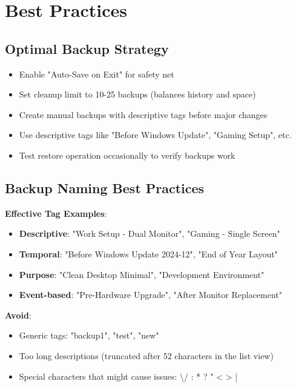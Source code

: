 \documentclass[a4paper,11pt]{article}
\begin{document}
\section{Best Practices}

\subsection{Optimal Backup Strategy}

\begin{successbox}
  \begin{itemize}
    \item Enable "Auto-Save on Exit" for safety net
    \item Set cleanup limit to 10-25 backups (balances history and space)
    \item Create manual backups with descriptive tags before major changes
    \item Use descriptive tags like "Before Windows Update", "Gaming
      Setup", etc.
    \item Test restore operation occasionally to verify backups work
  \end{itemize}
\end{successbox}

\subsection{Backup Naming Best Practices}

\textbf{Effective Tag Examples}:
\begin{itemize}
  \item \textbf{Descriptive}: "Work Setup - Dual Monitor", "Gaming -
    Single Screen"
  \item \textbf{Temporal}: "Before Windows Update 2024-12", "End of Year Layout"
  \item \textbf{Purpose}: "Clean Desktop Minimal", "Development Environment"
  \item \textbf{Event-based}: "Pre-Hardware Upgrade", "After Monitor
    Replacement"
\end{itemize}

\textbf{Avoid}:
\begin{itemize}
  \item Generic tags: "backup1", "test", "new"
  \item Too long descriptions (truncated after 52 characters in the list view)
  \item Special characters that might cause issues: \textbackslash /
    : * ? " < > |
\end{itemize}
\end{document}

